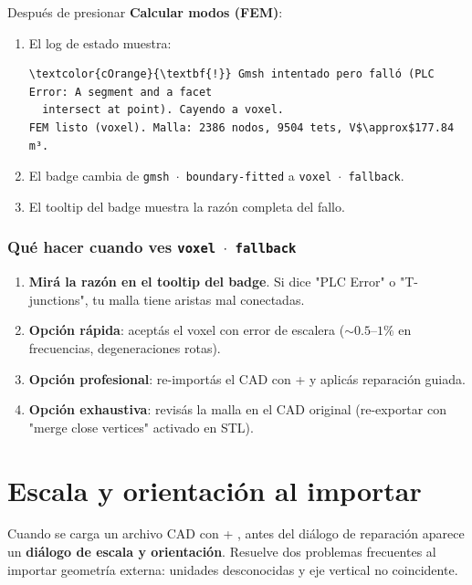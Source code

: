 \documentclass[11pt, a4paper]{article}
\newcommand{\tecla}[1]{\texttt{\small\fbox{#1}}}
\newcommand{\menu}[1]{\textbf{\guillemotleft #1\guillemotright}}
\begin{document}
Después de presionar \menu{Calcular modos (FEM)}:

\begin{enumerate}[itemsep=2pt]
  \item El log de estado muestra:
\begin{verbatim}
\textcolor{cOrange}{\textbf{!}} Gmsh intentado pero falló (PLC Error: A segment and a facet
  intersect at point). Cayendo a voxel.
FEM listo (voxel). Malla: 2386 nodos, 9504 tets, V$\approx$177.84 m³.
\end{verbatim}
  \item El badge cambia de \textcolor{blue!60!black}{\textbullet} \texttt{gmsh $\cdot$ boundary-fitted} a
        \textcolor{orange!70!black}{\textbullet} \texttt{voxel $\cdot$ fallback}.
  \item El tooltip del badge muestra la razón completa del fallo.
\end{enumerate}

\subsubsection*{Qué hacer cuando ves \texttt{voxel $\cdot$ fallback}}

\begin{enumerate}[itemsep=2pt]
  \item \textbf{Mirá la razón en el tooltip del badge}. Si dice
        "PLC Error" o "T-junctions", tu malla tiene aristas mal conectadas.
  \item \textbf{Opción rápida}: aceptás el voxel con error de escalera
        ($\sim 0.5$--$1\%$ en frecuencias, degeneraciones rotas).
  \item \textbf{Opción profesional}: re-importás el CAD con
        \tecla{Ctrl} + \tecla{I} y aplicás reparación guiada.
  \item \textbf{Opción exhaustiva}: revisás la malla en el CAD original
        (re-exportar con "merge close vertices" activado en STL).
\end{enumerate}

\section{Escala y orientación al importar}

Cuando se carga un archivo CAD con \tecla{Ctrl} + \tecla{I}, antes del
diálogo de reparación aparece un \textbf{diálogo de escala y orientación}.
Resuelve dos problemas frecuentes al importar geometría externa: unidades
desconocidas y eje vertical no coincidente.
\end{document}
